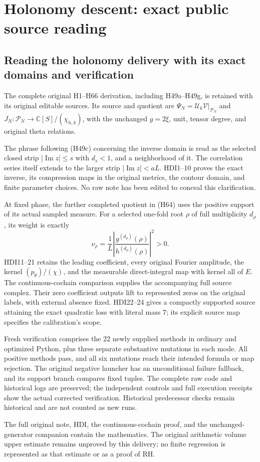 \begingroup

\section{Holonomy descent: exact public source reading}


\subsection{Reading the holonomy delivery with its exact domains and verification}
The complete original H1--H66 derivation, including H49a--H49g,
is retained with its original editable sources. Its source and
quotient are \(\Psi_N=\mathcal U_k\mathcal V|_{\mathcal P_N}\)
and \(J_N:\mathcal P_N\to\mathbb C[S]/(\chi_{h,k})\), with
the unchanged \(g=2\xi\), unit, tensor degree, and original
theta relations.

The phrase following (H49c) concerning the inverse domain is read
as the selected closed strip \(|\operatorname{Im}z|\le s\)
with \(d_s<1\), and a neighborhood of it. The correlation
series itself extends to the larger strip
\(|\operatorname{Im}z|<aL\). HDI1--10 proves the exact inverse,
its compression maps in the original metrics, the contour
domain, and finite parameter choices. No raw note has been
edited to conceal this clarification.

At fixed phase, the further completed quotient in (H64) uses the
positive support of its actual sampled measure. For a selected
one-fold root \(\rho\) of full multiplicity \(d_\rho\), its weight
is exactly
\[
 \nu_\rho=\frac1L\left|
 \frac{g^{(d_\rho)}(\rho)}{h^{(d_\rho)}(\rho)}
 \right|^2>0.
\]
HDI11--21 retains the leading coefficient, every original
Fourier amplitude, the kernel \((p_\theta)/(\chi)\), and the
measurable direct-integral map with kernel all of \(E\).
The continuous-cochain comparison supplies the accompanying
full source complex. Their zero coefficient outputs lift to
represented zeros on the original labels, with external
absence fixed. HDI22--24 gives a compactly supported source
attaining the exact quadratic loss with literal mass \(7\);
its explicit source map specifies the calibration's scope.

Fresh verification comprises the 22 newly supplied methods in
ordinary and optimized Python, plus three separate substantive
mutations in each mode. All positive methods pass, and all six
mutations reach their intended formula or map rejection.
The original negative launcher has an unconditional failure
fallback, and its support branch compares fixed tuples.
The complete raw code and historical logs are preserved;
the independent controls and full execution receipts show
the actual corrected verification. Historical predecessor
checks remain historical and are not counted as new runs.

The full original note, HDI, the continuous-cochain proof,
and the unchanged-generator companion contain the mathematics.
The original arithmetic volume upper estimate remains
unproved by this delivery; no finite regression is represented
as that estimate or as a proof of RH.


\endgroup
